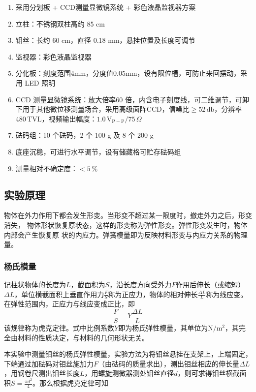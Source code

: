 \documentclass[UTF8]{article}
\theoremstyle{MyLineTheoremStyle} %
\theoremstyle{MyBlockTheoremStyle} %
\theoremstyle{MySubsubsectionStyle} %
\begin{document}
\begin{enumerate}[leftmargin=2cm]
    \item 采用分划板 + CCD测量显微镜系统 + 彩色液晶监视器方案
    \item 立柱：不锈钢双柱高约 85 cm
    \item 钼丝：长约 60 cm，直径 0.18 mm，悬挂位置及长度可调节
    \item 监视器：彩色液晶监视器
    \item 分化板：刻度范围4mm，分度值0.05mm，设有限位槽，可防止来回摆动，采用 LED 照明
    \item CCD 测量显微镜系统：放大倍率60 倍，内含电子刻度线，可二维调节，可卸下用于其他微位移测量场合，采用高级面阵CCD，信噪比$ \geqslant 52\,\mathrm{db} $，分辨率$ 480\,\mathrm{TVL} $，视频输出幅度：$ 1.0\,\mathrm{V_{P-P}}/75\,\Omega $
    \item  砝码组：10 个砝码，2 个 100 g 及 8 个 200 g
    \item 底座沉稳，可进行水平调节，设有储藏格可贮存砝码组
    \item 测量相对不确定度：$< 5\ \%$
\end{enumerate}


\subsection{实验原理}
物体在外力作用下都会发生形变。当形变不超过某一限度时，撤走外力之后，形变消失，
物体形状恢复原状态，这样的形变称为弹性形变。弹性形变发生时，物体内部会产生恢复原
状的内应力。弹簧模量即为反映材料形变与内应力关系的物理量。

\subsubsection{杨氏模量}

记柱状物体的长度为$ L $，截面积为$ S $，沿长度方向受外力$ F $作用后伸长（或缩短）$ \Delta L $，单位横截面积上垂直作用力$ \frac FS $称为正应力，物体的相对伸长$ \frac{\Delta L}{L} $称为线应变。在弹性范围内，正应力与线应变成正比，即
\begin{equation}
    \frac FS=Y\frac{\Delta L}{L}
\end{equation}
该规律称为虎克定律。式中比例系数$ Y $即为杨氏弹性模量，其单位为$ \mathrm{N/m^2} $，其完全由材料的性质决定，与材料的几何形状无关。

本实验中测量钼丝的杨氏弹性模量，实验方法为将钼丝悬挂在支架上，上端固定，下端通过加砝码对钼丝施加力$ F $（由砝码的质量求出），测出钼丝相应的伸长量$ \Delta L $，用钢卷尺测出钼丝长度$ L $，用螺旋测微器测处钼丝直径$ d $，则可求得钼丝横截面积$ S=\frac{\pi d^2}{4} $。那么根据虎克定律可知
\end{document}
